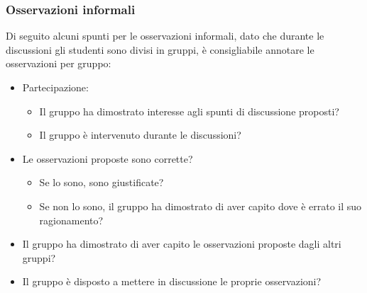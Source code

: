 \documentclass[../../docenti.tex]{subfiles}
\begin{document}
\subsubsection{Osservazioni informali}
Di seguito alcuni spunti per le osservazioni informali, dato che durante le discussioni gli studenti sono divisi in gruppi, è consigliabile annotare le osservazioni per gruppo:
\begin{itemize}
	\item Partecipazione:
	\begin{itemize}
		\item Il gruppo ha dimostrato interesse agli spunti di discussione proposti?
		\item Il gruppo è intervenuto durante le discussioni?
	\end{itemize}
	\item Le osservazioni proposte sono corrette?
	\begin{itemize}
		\item Se lo sono, sono giustificate?
		\item Se non lo sono, il gruppo ha dimostrato di aver capito dove è errato il suo ragionamento?
	\end{itemize}
	\item Il gruppo ha dimostrato di aver capito le osservazioni proposte dagli altri gruppi?
	\item Il gruppo è disposto a mettere in discussione le proprie osservazioni?
\end{itemize}
\end{document}
